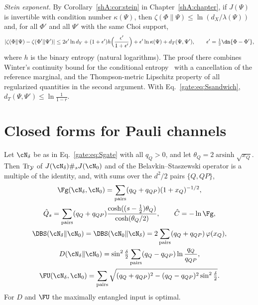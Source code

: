 \emph{Stein exponent.} By Corollary~\ref{shA:cor:stein} in Chapter~\ref{shA:chapter}, if $J(\Psi)$ is invertible with condition number $\kappa(\Psi)$, then $\zeta(\Phi\|\Psi)\le\ln(d_X/\lambda(\Psi))$ and, for all $\Phi'$ and all $\Psi'$ with the same Choi support,
\begin{equation}\label{gate:eq:Sstein}
|\zeta(\Phi\|\Psi)-\zeta(\Phi'\|\Psi')|\le2\epsilon'\ln d_Y+(1+\epsilon')h\Big(\frac{\epsilon'}{1+\epsilon'}\Big)+\epsilon'\ln\kappa(\Psi)+d_T(\Psi,\Psi'),\qquad\epsilon'=\tfrac12\dn{\Phi-\Phi'},
\end{equation}
where $h$ is the binary entropy (natural logarithms). The proof there combines Winter's continuity bound for the conditional entropy~\cite{Winter2016} with a cancellation of the reference marginal, and the Thompson-metric Lipschitz property of all regularized quantities in the second argument. With Eq.~\eqref{gate:eq:Ssandwich}, $d_T(\Psi,\Psi')\le\ln\frac{1}{1-r}$.

\section{Closed forms for Pauli channels}\label{gate:sec:pauli}

\begin{theorem}\label{gate:thm:B}
Let $\cN_\delta$ be as in Eq.~\eqref{gate:eq:Sgate} with all $q_Q>0$, and let $\theta_Q=2\operatorname{arsinh}\sqrt{x_Q}$. Then $\operatorname{Tr}_{\mathcal Y}$ of $J(\cN_\delta)\#_sJ(\cN_0)$ and of the Belavkin--Staszewski operator is a multiple of the identity, and, with sums over the $d^2/2$ pairs $\{Q,QP\}$,
\begin{gather}
\Fg(\cN_\delta,\cN_0)=\sum_{\rm pairs}(q_Q+q_{QP})(1+x_Q)^{-1/2},\notag\\
\hat Q_s=\sum_{\rm pairs}(q_Q+q_{QP})\frac{\cosh((s-\frac12)\theta_Q)}{\cosh(\theta_Q/2)},\qquad \hat C=-\ln\Fg,\\
\DBS(\cN_\delta\|\cN_0)=\DBS(\cN_0\|\cN_\delta)=2\sum_{\rm pairs}(q_Q+q_{QP})\,\varphi(x_Q),\\
D(\cN_\delta\|\cN_0)=\sin^2\tfrac\delta2\sum_{\rm pairs}(q_Q-q_{QP})\ln\frac{q_Q}{q_{QP}},\notag\\
\FU(\cN_\delta,\cN_0)=\sum_{\rm pairs}\sqrt{(q_Q+q_{QP})^2-(q_Q-q_{QP})^2\sin^2\tfrac\delta2}.
\end{gather}
For $D$ and $\FU$ the maximally entangled input is optimal.
\end{theorem}

